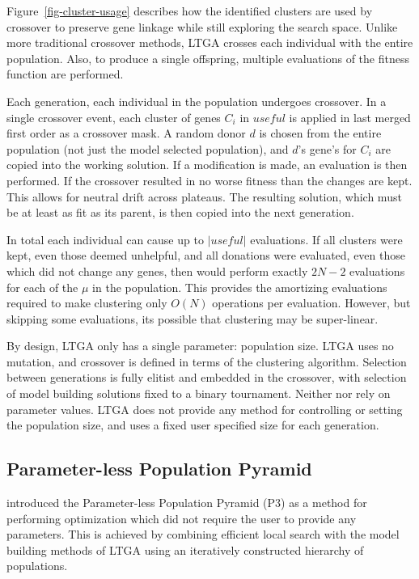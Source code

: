 \documentclass[twoside]{article}
\begin{document}
Figure~\ref{fig-cluster-usage} describes how the identified clusters are used by crossover to preserve
gene linkage while still exploring the search space. Unlike more traditional crossover methods, LTGA
crosses each individual with the entire population. Also, to produce a single offspring, multiple evaluations
of the fitness function are performed.

Each generation, each individual in the population undergoes crossover. In a single crossover event, each
cluster of genes $C_i$ in $useful$ is applied in last merged first order as a crossover mask. A random donor $d$
is chosen from the entire population (not just the model selected population), and $d$'s gene's for $C_i$ are copied
into the working solution. If a modification is made, an evaluation is then performed. If the crossover
resulted in no worse fitness than the changes are kept. This allows for neutral drift across plateaus.
The resulting solution, which must be at least as fit as its parent, is then
copied into the next generation.


In total each individual can cause up to $|useful|$ evaluations. If all clusters were kept, even those deemed
unhelpful, and all donations were evaluated, even those which did not change any genes, then 
would perform exactly $2N-2$ evaluations for each of the $\mu$ in the population. This provides the amortizing evaluations
required to make clustering only $O(N)$ operations per evaluation. However, but skipping some evaluations, its
possible that clustering may be super-linear.

By design, LTGA only has a single parameter: population size. LTGA uses no mutation, and crossover is defined
in terms of the clustering algorithm. Selection between generations is fully elitist and embedded in the crossover,
with selection of model building solutions fixed to a binary tournament. Neither  nor
 rely on parameter values. LTGA does not provide any method for controlling or setting
the population size, and uses a fixed user specified size for each generation.

\subsection{Parameter-less Population Pyramid}
\cite{goldman:2014:p3} introduced the Parameter-less Population Pyramid (P3) as a method for
performing optimization which did not require the user to provide any parameters. This is
achieved by combining efficient local search with the model building methods of LTGA using
an iteratively constructed hierarchy of populations.
\end{document}
